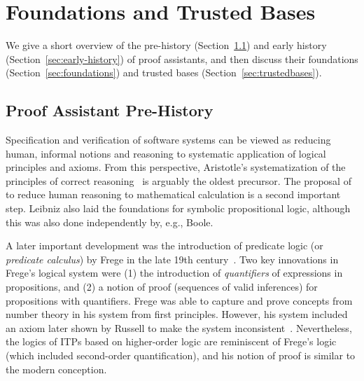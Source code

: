 \chapter{Foundations and Trusted Bases}
\label{ch:foundations}

We give a short overview of the pre-history (Section~\ref{sec:pre}) and early history (Section~\ref{sec:early-history}) of proof assistants, and then 
discuss their foundations (Section~\ref{sec:foundations}) and trusted bases (Section~\ref{sec:trustedbases}). 

\section{Proof Assistant Pre-History}
\label{sec:pre}

Specification and verification of software systems can be viewed as reducing human, informal notions and reasoning to systematic application of logical principles and axioms. From this perspective, Aristotle's systematization of the principles of correct reasoning~\citep{AristotlePriorAnalytics,sep-aristotle-logic} is arguably the oldest precursor. The proposal of \cite{Leibniz1685} to reduce human reasoning to mathematical calculation %
is a second important step. Leibniz also laid the foundations for symbolic propositional logic, although this was also done independently by, e.g., Boole.

A later important development was the introduction of predicate logic (or \emph{predicate calculus}) by Frege in the late 19th century~\citep{Frege1893,sep-frege}. Two key innovations in Frege's logical system were (1) the introduction of \emph{quantifiers} of expressions in propositions, and (2) a notion of proof (sequences of valid inferences) for propositions with quantifiers. Frege was able to capture and prove concepts from number theory in his system from first principles. However, his system included an axiom later shown by Russell to make the system inconsistent~\citep{sep-frege-theorem}. Nevertheless, the logics of ITPs based on higher-order logic are reminiscent of Frege's logic (which included second-order quantification), and his notion of proof is similar to the modern conception.

